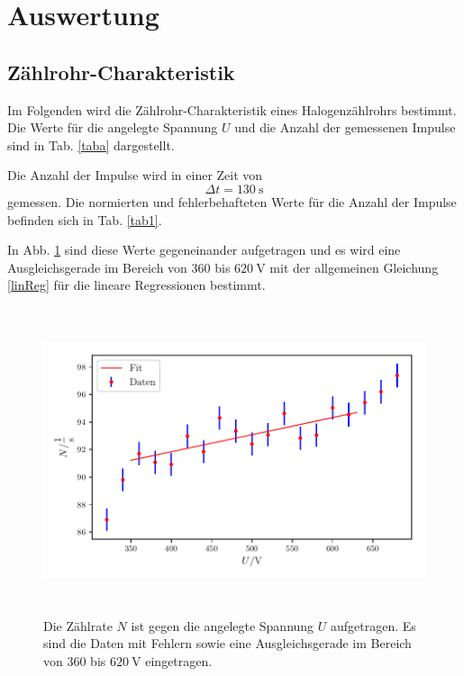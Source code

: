 \section{Auswertung}
\label{sec:Auswertung}


\subsection{Zählrohr-Charakteristik}

Im Folgenden wird die Zählrohr-Charakteristik eines Halogenzählrohrs bestimmt. Die Werte für die angelegte Spannung $U$ und die Anzahl der gemessenen Impulse sind in Tab. \ref{taba} dargestellt. 



\noindent Die Anzahl der Impulse wird in einer Zeit von 
\begin{equation*}
    \Delta t = \SI{130}{\second}
\end{equation*}
gemessen. 
Die normierten und fehlerbehafteten Werte für die Anzahl der Impulse befinden sich in Tab. \ref{tab1}. 



\noindent In Abb. \ref{fig1} sind diese Werte gegeneinander aufgetragen und es wird eine Ausgleichsgerade im Bereich von $\num{360}$ bis $\SI{620}{\volt}$ mit der allgemeinen Gleichung \eqref{linReg} für die lineare Regressionen bestimmt. 

\begin{figure}
    \centering
    \includegraphics[width=15cm, height=9cm]{build/plot1.pdf}
    \caption{Die Zählrate $N$ ist gegen die angelegte Spannung $U$ aufgetragen. Es sind die Daten mit Fehlern sowie eine Ausgleichsgerade im Bereich von $\num{360}$ bis $\SI{620}{\volt}$ eingetragen.}
    \label{fig1}
\end{figure}

